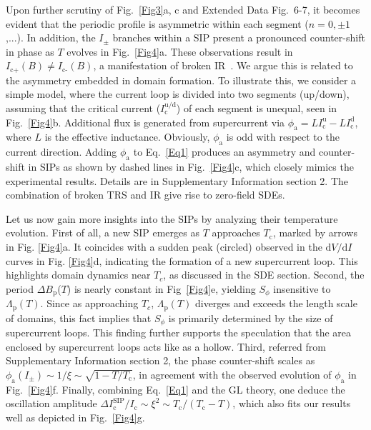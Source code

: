 \documentclass[article,reprint,amsmath,amssymb,superscriptaddress,longbibliography]{revtex4-1}
\begin{document}

Upon further scrutiny of Fig.~\ref{Fig3}a, c and Extended Data Fig.~6-7, it becomes evident that the periodic profile is asymmetric within each segment ($n=0,\pm1$,...). In addition, the $I_\pm$ branches within a SIP present a pronounced counter-shift in phase as $T$ evolves in Fig.~\ref{Fig4}a. These observations result in $I_\text{c+}(B)\neq I_\text{c-}(B)$, a manifestation of broken IR~\cite{WuCJ2022Arxiv}. We argue this is related to the asymmetry embedded in domain formation. To illustrate this, we consider a simple model, where the current loop is divided into two segments (up/down), assuming that the critical current ($I^\textrm{u/d}_\textrm{c}$) of each segment is unequal, seen in Fig.~\ref{Fig4}b. Additional flux is generated from supercurrent via
$\phi_\text{a}=LI^\textrm{u}_\textrm{c}-LI^\textrm{d}_\textrm{c}$, where $L$ is the effective inductance. Obviously, $\phi_\text{a}$ is odd with respect to the current direction. Adding $\phi_\text{a}$ to Eq.~\ref{Eq1} produces an asymmetry and counter-shift in SIPs as shown by dashed lines in Fig.~\ref{Fig4}c, which closely mimics the experimental results. Details are in Supplementary Information section 2. The combination of broken TRS and IR give rise to zero-field SDEs. 

Let us now gain more insights into the SIPs by analyzing their temperature evolution. First of all, a new SIP emerges as $T$ approaches $T_\textrm{c}$, marked by arrows in Fig. \ref{Fig4}a. It  coincides with a sudden peak (circled) observed in the $\textrm{d}V/\textrm{d}I$ curves in Fig. \ref{Fig4}d, indicating the formation of a new supercurrent loop. This highlights domain dynamics near $T_c$, as discussed in the SDE section. Second, the period $\Delta B_\textrm{p}$($T$) is nearly constant in Fig~\ref{Fig4}e, yielding $S_\phi$ insensitive to $\Lambda_\textrm{p}(T)$. Since as approaching $T_c$, $\Lambda_\textrm{p}(T)$ diverges and exceeds the length scale of domains, this fact implies that 
$S_\phi$ is primarily determined by the size of supercurrent loops. This finding further supports the speculation that the area enclosed by supercurrent loops acts like as a hollow. Third, referred from Supplementary Information section 2, the phase counter-shift scales as $\phi_\textrm{a}(I_\pm)\sim 1/\xi \sim \sqrt{1-T/T_\textrm{c}}$, in agreement  with the observed evolution of $\phi_\textrm{a}$ in Fig.~\ref{Fig4}f. Finally, combining Eq.~\ref{Eq1} and the GL theory, one deduce the oscillation amplitude $\Delta I^\textrm{SIP}_\textrm{c}/I_\textrm{c}\sim\xi^2\sim T_\textrm{c}/(T_\textrm{c}-T)$, which also fits our results well as depicted in Fig.~\ref{Fig4}g. %
\end{document}
